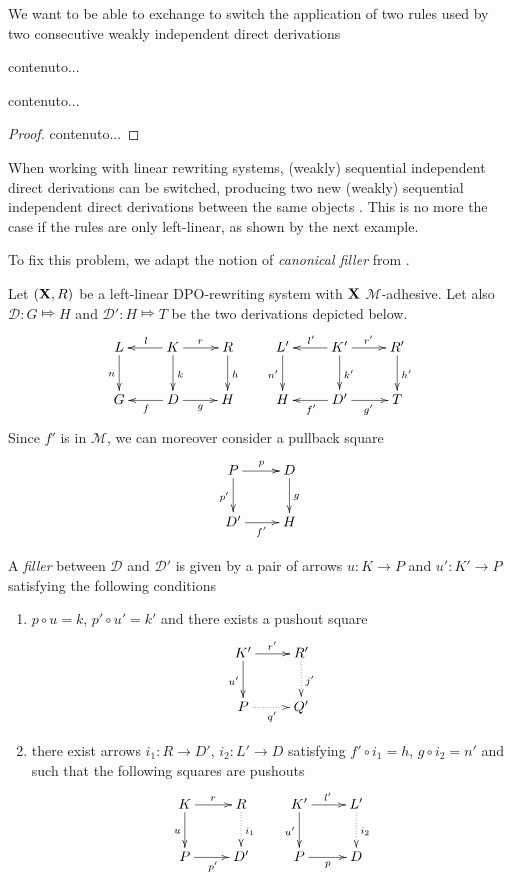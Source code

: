 \documentclass[a4paper,UKenglish,cleveref,pdftex, thm-restate,numberwithinsect]{lipics}
\def\R{\mathsf{R}}
\def\X{\textbf {\textup{X}}}
\renewcommand{\P}{\textbf {\textup{P}}}
\newcommand{\dder}[1]{\mathscr{#1}}
\begin{document}
We want to be able to exchange to switch the application of two rules used by two consecutive weakly independent direct derivations
\begin{definition}
	contenuto...
\end{definition}

\begin{proposition}
\end{proposition}
\begin{remark}
	contenuto...
\end{remark}
\begin{proof}
	contenuto...
\end{proof}




When working with linear rewriting systems, (weakly) sequential independent direct derivations can be switched, producing two new (weakly) sequential independent direct derivations between the same objects \cite[Thm.~$7.7$]{lack2005adhesive} . This is no more the case if the rules are only left-linear, as shown by the next example.

\begin{example}\label{ex:difficile}
\end{example}

To fix this problem, we adapt the notion of \emph{canonical filler} from \cite{heindel2009category}.






\begin{definition}\label{def:filler}
Let $(\X, \R)$ be a left-linear DPO-rewriting system with $\X$ $\mathcal{M}$-adhesive. Let also $\dder{D}\colon G\Mapsto H$ and $\dder{D}'\colon H\Mapsto T$ be the two derivations depicted below.
\[\xymatrix{L \ar[d]_{n}& K \ar[d]^{k}\ar[l]_{l} \ar[r]^{r} & R \ar[d]^{h} & L' \ar[d]_{n'}& K' \ar[d]^{k'}\ar[l]_{l'} \ar[r]^{r'} & R' \ar[d]^{h'}\\G & \ar[l]^{f} D \ar[r]_{g}& H & H & \ar[l]^{f'} D' \ar[r]_{g'}& T}\]
Since $f'$ is in $\mathcal{M}$, we can moreover consider a pullback square
\[\xymatrix{P \ar[r]^{p} \ar[d]_{p'}& D\ar[d]^{g} \\ D' \ar[r]_{f'} & H}\]

A \emph{filler} between $\dder{D}$ and $\dder{D}'$ is  given by a pair of arrows $u\colon K\to P$ and $u'\colon K'\to P$ satisfying the following conditions
\begin{enumerate}
	\item $p\circ u = k$, $p'\circ u' = k'$ and there exists a pushout square
\[\xymatrix{K' \ar[r]^{r'} \ar[d]_{u'}& R'\ar@{.>}[d]^{j'} \\ P \ar@{.>}[r]_{q'} & Q'}\]
	\item  there exist arrows $i_1\colon R\to D'$, $i_2\colon L'\to D$ satisfying $f'\circ i_1=h$, $g\circ i_2=n'$ and such that the following squares are pushouts
\[\xymatrix{K \ar[r]^{r} \ar[d]_{u}& R \ar@{.>}[d]^{i_1} &K' \ar[r]^{l'} \ar[d]_{u'}& L'\ar@{.>}[d]^{i_2} \\P \ar[r]_{p'}& D' & P \ar[r]_{p} & D}\]
\end{enumerate}
\end{definition}
\end{document}
